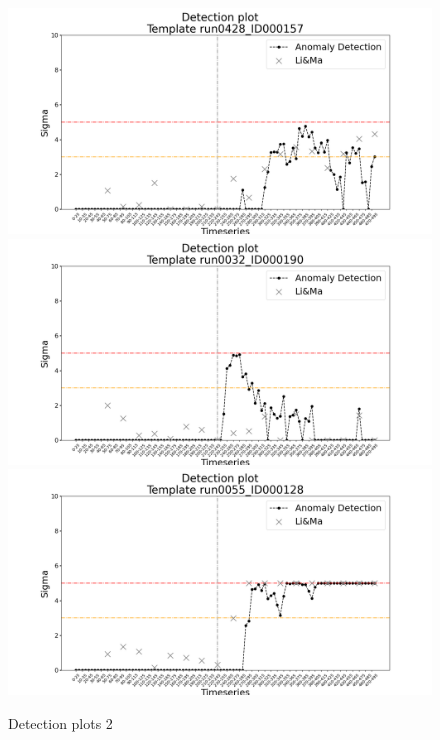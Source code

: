 \begin{figure}[!htb]
    \includegraphics[width=1\textwidth]{figures/experiments/detection_plots/detection_plot_run0428_ID000157_testset_e.png}\hfill
    \\[\smallskipamount]

    \includegraphics[width=1\textwidth]{figures/experiments/detection_plots/detection_plot_run0032_ID000190_testset_e.png}\hfill
    \\[\smallskipamount]
    
    \includegraphics[width=1\textwidth]{figures/experiments/detection_plots/detection_plot_run0055_ID000128_testset_e.png}\hfill
    \\[\smallskipamount]
    \caption{Detection plots 2}\label{fig:detection-plots-2}
\end{figure}



